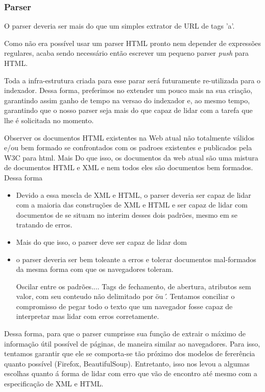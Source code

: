 \documentclass[10pt,twocolumn]{article}
\begin{document}
\subsubsection{Parser}

O parser deveria ser mais do que um simples extrator de URL de tags 'a'.

Como não era possível usar um parser HTML pronto nem depender de expressões
regulares, acaba sendo necessário então escrever um pequeno parser \emph{push}
para HTML.

Toda a infra-estrutura criada para esse parar será futuramente re-utilizada
para o indexador. Dessa forma, preferimos no extender um pouco mais na sua
criação, garantindo assim ganho de tempo na versao do indexador e, ao mesmo
tempo, garantindo que o nosso parser seja mais do que capaz de lidar com a
tarefa que lhe é solicitada no momento.

Observer os documentos HTML existentes na Web atual não totalmente válidos e/ou
bem formado se confrontados com os padroes existentes e publicados pela W3C
para html. Mais Do que isso, os documentos da web atual são uma mistura de
documentos HTML e XML e nem todos eles são documentos bem formados. Dessa forma

\begin{itemize}

\item Devido a essa mescla de XML e HTML, o parser deveria ser capaz de lidar
com a maioria das construções de XML e HTML e ser capaz de lidar com documentos
de se situam no interim desses dois padrões, mesmo em se tratando de erros.

\item Mais do que isso, o parser deve ser capaz de lidar dom

\item o parser deveria ser bem toleante a erros e tolerar documentos
mal-formados da mesma forma com que os navegadores toleram. 

Oscilar entre os padrões.... Tags de fechamento, de abertura, atributos sem
valor, com seu conteudo não delimitado por \" ou \'. Tentamos conciliar o
compromisso de pegar todo o texto que um navegador fosse capaz de interpretar
mas lidar com erros corretamente.

\end{itemize}

Dessa forma, para que o parser cumprisse sua função de extrair o máximo de
informação útil possível de páginas, de maneira similar ao navegadores. Para
isso, tentamos garantir que ele se comporta-se tão próximo dos modelos de
fererência quanto possível (Firefox, BeautifulSoup). Entretanto, isso nos levou
a algumas escolhas quanto á forma de lidar com erro que vão de encontro até
mesmo com a especificação de XML e HTML.
\end{document}
